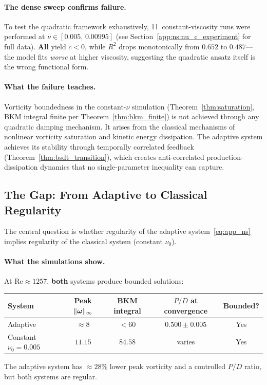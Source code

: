 \paragraph{The dense sweep confirms failure.}
To test the quadratic framework exhaustively, 11~constant-viscosity
runs were performed at $\nu \in [0.005,\, 0.00995]$
(see Section~\ref{app:ns:nu_c_experiment} for full data).
\textbf{All} yield $c < 0$, while $R^2$ drops monotonically
from $0.652$ to $0.487$---the model fits \emph{worse} at
higher viscosity, suggesting the quadratic ansatz itself
is the wrong functional form.

\paragraph{What the failure teaches.}
Vorticity boundedness in the constant-$\nu$ simulation
(Theorem~\ref{thm:saturation}, BKM integral finite per
Theorem~\ref{thm:bkm_finite}) is not achieved through
any quadratic damping mechanism.  It arises from the
classical mechanisms of nonlinear vorticity saturation
and kinetic energy dissipation.  The adaptive system
achieves its stability through temporally correlated
feedback (Theorem~\ref{thm:bsdt_transition}), which
creates anti-correlated production-dissipation dynamics
that no single-parameter inequality can capture.

\subsection{The Gap: From Adaptive to Classical Regularity}
\label{app:ns:gap}

The central question is whether regularity of the adaptive
system~\eqref{eq:app_ns} implies regularity of the classical
system (constant $\nu_0$).

\paragraph{What the simulations show.}
At $\mathrm{Re} \approx 1257$, \textbf{both} systems produce
bounded solutions:
\begin{center}
\begin{tabular}{@{}lcccc@{}}
\toprule
System & Peak $\lVert \bm{\omega} \rVert_\infty$ & BKM integral
  & $P/D$ at convergence & Bounded? \\
\midrule
Adaptive & $\approx 8$ & $< 60$ & $0.500 \pm 0.005$ & Yes \\
Constant $\nu_0 = 0.005$ & $11.15$ & $84.58$ & varies & Yes \\
\bottomrule
\end{tabular}
\end{center}
The adaptive system has $\approx 28\%$ lower peak vorticity
and a controlled $P/D$ ratio, but both systems are regular.

